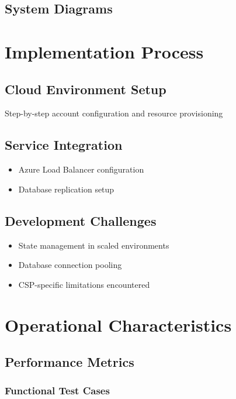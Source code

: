 \documentclass{llncs}
\begin{document}
\subsection{System Diagrams}

\section{Implementation Process}
\subsection{Cloud Environment Setup}
Step-by-step account configuration and resource provisioning

\subsection{Service Integration}
\begin{itemize}
    \item Azure Load Balancer configuration
    \item Database replication setup
\end{itemize}

\subsection{Development Challenges}
\begin{itemize}
    \item State management in scaled environments
    \item Database connection pooling
    \item CSP-specific limitations encountered
\end{itemize}

\section{Operational Characteristics}
\subsection{Performance Metrics}

\subsubsection{Functional Test Cases}
\end{document}
